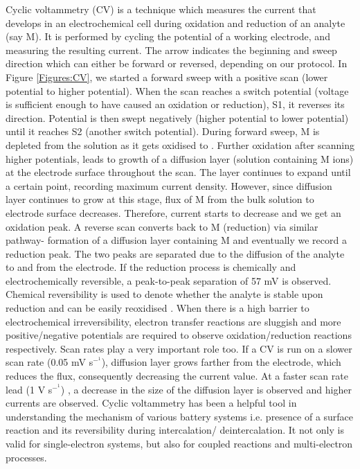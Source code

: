 Cyclic voltammetry (CV) is a technique which measures the current that develops in an electrochemical cell during oxidation and reduction of an analyte (say M). It is performed by cycling the potential of a working electrode, and measuring the resulting current. The arrow indicates the beginning and sweep direction which can either be forward or reversed, depending on our protocol. In Figure \ref{Figures:CV}, we started a forward sweep with a positive scan (lower potential to higher potential). When the scan reaches a switch potential (voltage is sufficient enough to have caused an oxidation or reduction), S1, it reverses its direction. Potential is then swept negatively (higher potential to lower potential) until it reaches S2 (another switch potential). During forward sweep, M is depleted from the solution as it gets oxidised to . Further oxidation after scanning higher potentials, leads to growth of a diffusion layer (solution containing M ions) at the electrode surface throughout the scan. The layer continues to expand until a certain point, recording maximum current density. However, since diffusion layer continues to grow at this stage, flux of M from the bulk solution to electrode surface decreases. Therefore, current starts to decrease and we get an oxidation peak. A reverse scan converts  back to M (reduction) via similar pathway- formation of a diffusion layer containing M and eventually we record a reduction peak. The two peaks are separated due to the diffusion of the analyte to and from the electrode. If the reduction process is chemically and electrochemically reversible, a peak-to-peak separation of 57 mV is observed. Chemical reversibility is used to denote whether the analyte is stable upon reduction and can be easily reoxidised \cite{bard_electrochemical_1980}. When there is a high barrier to electrochemical irreversibility, electron transfer reactions are sluggish and more positive/negative potentials are required to observe oxidation/reduction reactions respectively. Scan rates play a very important role too. If a CV is run on a slower scan rate (0.05 mV s$^-^1$), diffusion layer grows farther from the electrode, which reduces the flux, consequently decreasing the current value. At a faster scan rate lead (1 V s$^-^1$) , a decrease in the size of the diffusion layer is observed and higher currents are observed. Cyclic voltammetry has been a helpful tool in understanding the mechanism of various battery systems i.e. presence of a surface reaction and its reversibility during intercalation/ deintercalation. It not only is valid for single-electron systems, but also for coupled reactions and multi-electron processes.  

